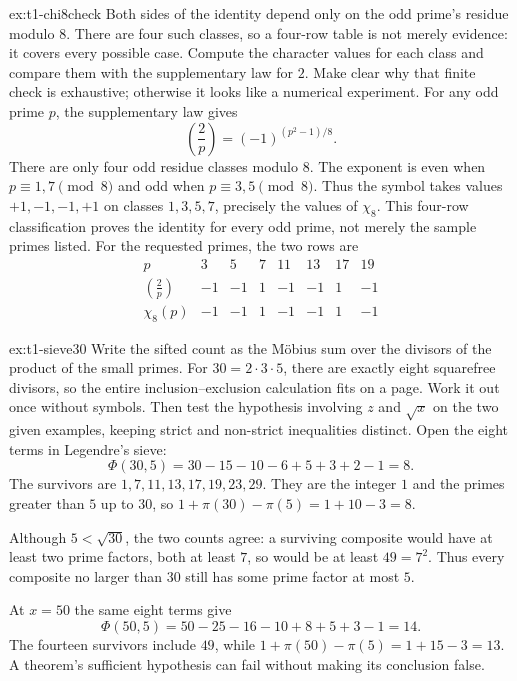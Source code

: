 \begin{solution}{ex:t1-chi8check}
\idea Both sides of the identity depend only on the odd prime's residue modulo $8$. There are four such classes, so a four-row table is not merely evidence: it covers every possible case. Compute the character values for each class and compare them with the supplementary law for $2$. Make clear why that finite check is exhaustive; otherwise it looks like a numerical experiment.
\writeup For any odd prime $p$, the supplementary law gives
\[
\left(\frac2p\right)=(-1)^{(p^2-1)/8}.
\]
There are only four odd residue classes modulo $8$. The exponent is even when $p\equiv1,7\pmod8$ and odd when $p\equiv3,5\pmod8$. Thus the symbol takes values $+1,-1,-1,+1$ on classes $1,3,5,7$, precisely the values of $\chi_8$. This four-row classification proves the identity for every odd prime, not merely the sample primes listed.
For the requested primes, the two rows are
\[
\begin{array}{c|rrrrrrr}
p&3&5&7&11&13&17&19\\\hline
\left(\frac2p\right)&-1&-1&1&-1&-1&1&-1\\
\chi_8(p)&-1&-1&1&-1&-1&1&-1
\end{array}
\]
\end{solution}

\begin{solution}{ex:t1-sieve30}
\idea Write the sifted count as the Möbius sum over the divisors of the product of the small primes. For $30=2\cdot3\cdot5$, there are exactly eight squarefree divisors, so the entire inclusion--exclusion calculation fits on a page. Work it out once without symbols. Then test the hypothesis involving $z$ and $\sqrt x$ on the two given examples, keeping strict and non-strict inequalities distinct.
\writeup Open the eight terms in Legendre's sieve:
\[
\Phi(30,5)=30-15-10-6+5+3+2-1=8.
\]
The survivors are $1,7,11,13,17,19,23,29$. They are the integer $1$ and the primes greater than $5$ up to $30$, so
$1+\pi(30)-\pi(5)=1+10-3=8$.

Although $5<\sqrt{30}$, the two counts agree: a surviving composite would have at least two prime factors, both at least $7$, so would be at least $49=7^2$. Thus every composite no larger than $30$ still has some prime factor at most $5$.

At $x=50$ the same eight terms give
\[
\Phi(50,5)=50-25-16-10+8+5+3-1=14.
\]
The fourteen survivors include $49$, while $1+\pi(50)-\pi(5)=1+15-3=13$. A theorem's sufficient hypothesis can fail without making its conclusion false.
\end{solution}

